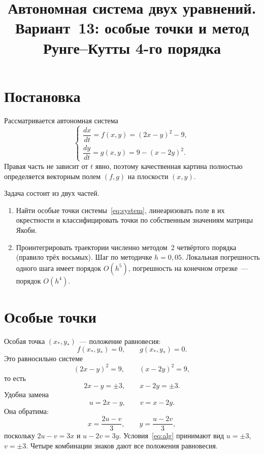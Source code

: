 \documentclass[12pt,a4paper]{article}
\title{Автономная система двух уравнений.\\
Вариант~13: особые точки и метод Рунге--Кутты 4-го порядка}
\author{}
\date{}
\begin{document}
\maketitle

\section{Постановка}

Рассматривается автономная система
\begin{equation}
\label{eq:system}
\begin{cases}
\dfrac{dx}{dt} = f(x,y) = (2x-y)^2 - 9,\\[1mm]
\dfrac{dy}{dt} = g(x,y) = 9 - (x-2y)^2.
\end{cases}
\end{equation}
Правая часть не зависит от \(t\) явно, поэтому качественная картина полностью определяется векторным полем \((f,g)\) на плоскости \((x,y)\).

Задача состоит из двух частей.
\begin{enumerate}
  \item Найти особые точки системы~\eqref{eq:system}, линеаризовать поле в их окрестности и классифицировать точки по собственным значениям матрицы Якоби.
  \item Проинтегрировать траектории численно методом~2 четвёртого порядка (правило трёх восьмых). Шаг по методичке \(h = 0{,}05\). Локальная погрешность одного шага имеет порядок \(O(h^5)\), погрешность на конечном отрезке~--- порядок \(O(h^4)\).
\end{enumerate}

\section{Особые точки}

Особая точка \((x_*, y_*)\)~--- положение равновесия:
\[
f(x_*, y_*) = 0, \qquad g(x_*, y_*) = 0.
\]
Это равносильно системе
\begin{equation}
\label{eq:alg}
(2x-y)^2 = 9, \qquad (x-2y)^2 = 9,
\end{equation}
то есть
\[
2x - y = \pm 3, \qquad x - 2y = \pm 3.
\]
Удобна замена
\begin{equation}
\label{eq:uv}
u = 2x - y, \qquad v = x - 2y.
\end{equation}
Она обратима:
\begin{equation}
\label{eq:xy}
x = \frac{2u - v}{3}, \qquad y = \frac{u - 2v}{3},
\end{equation}
поскольку \(2u - v = 3x\) и \(u - 2v = 3y\). Условия~\eqref{eq:alg} принимают вид \(u = \pm 3\), \(v = \pm 3\). Четыре комбинации знаков дают все положения равновесия.
\end{document}
